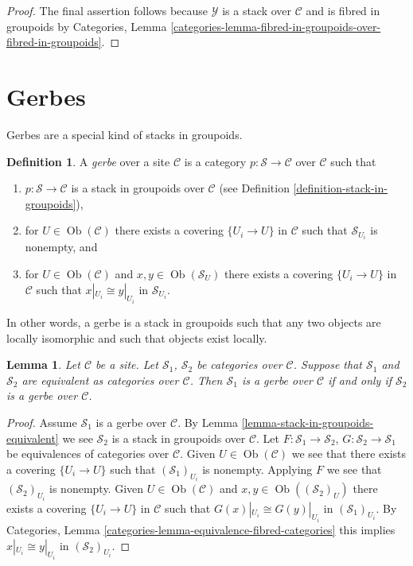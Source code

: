 \documentclass{stacks-project}
\theoremstyle{plain}
\newtheorem{lemma}[subsection]{Lemma}
\theoremstyle{definition}
\newtheorem{definition}[subsection]{Definition}
\theoremstyle{remark}
\numberwithin{equation}{subsection}
\def\Ob{\mathop{\mathrm{Ob}}\nolimits}
\begin{document}
\begin{proof}
\medskip\noindent
The final assertion follows because $\mathcal{Y}$ is a stack over
$\mathcal{C}$ and is fibred in groupoids by
Categories, Lemma
\ref{categories-lemma-fibred-in-groupoids-over-fibred-in-groupoids}.
\end{proof}





\section{Gerbes}
\label{section-gerbes}

\noindent
Gerbes are a special kind of stacks in groupoids.

\begin{definition}
\label{definition-gerbe}
A {\it gerbe} over a site $\mathcal{C}$ is a category
$p : \mathcal{S} \to \mathcal{C}$ over $\mathcal{C}$ such that
\begin{enumerate}
\item $p : \mathcal{S} \to \mathcal{C}$ is a stack
in groupoids over $\mathcal{C}$ (see
Definition \ref{definition-stack-in-groupoids}),
\item for $U \in \Ob(\mathcal{C})$ there exists
a covering $\{U_i \to U\}$ in $\mathcal{C}$ such that
$\mathcal{S}_{U_i}$ is nonempty, and
\item for $U \in \Ob(\mathcal{C})$ and
$x, y \in \Ob(\mathcal{S}_U)$ there exists
a covering $\{U_i \to U\}$ in $\mathcal{C}$ such that
$x|_{U_i} \cong y|_{U_i}$ in $\mathcal{S}_{U_i}$.
\end{enumerate}
\end{definition}

\noindent
In other words, a gerbe is a stack in groupoids such that any two objects
are locally isomorphic and such that objects exist locally.

\begin{lemma}
\label{lemma-gerbe-equivalent}
Let $\mathcal{C}$ be a site.
Let $\mathcal{S}_1$, $\mathcal{S}_2$ be categories over $\mathcal{C}$.
Suppose that $\mathcal{S}_1$ and $\mathcal{S}_2$ are equivalent
as categories over $\mathcal{C}$.
Then $\mathcal{S}_1$ is a gerbe over $\mathcal{C}$ if and only if
$\mathcal{S}_2$ is a gerbe over $\mathcal{C}$.
\end{lemma}

\begin{proof}
Assume $\mathcal{S}_1$ is a gerbe over $\mathcal{C}$. By
Lemma \ref{lemma-stack-in-groupoids-equivalent}
we see $\mathcal{S}_2$ is a stack in groupoids over $\mathcal{C}$.
Let $F : \mathcal{S}_1 \to \mathcal{S}_2$,
$G : \mathcal{S}_2 \to \mathcal{S}_1$ be equivalences of categories over
$\mathcal{C}$. Given $U \in \Ob(\mathcal{C})$ we see that there exists
a covering $\{U_i \to U\}$ such that $(\mathcal{S}_1)_{U_i}$ is
nonempty. Applying $F$ we see that $(\mathcal{S}_2)_{U_i}$ is nonempty.
Given $U \in \Ob(\mathcal{C})$ and
$x, y \in \Ob((\mathcal{S}_2)_U)$ there exists
a covering $\{U_i \to U\}$ in $\mathcal{C}$ such that
$G(x)|_{U_i} \cong G(y)|_{U_i}$ in $(\mathcal{S}_1)_{U_i}$. By
Categories, Lemma \ref{categories-lemma-equivalence-fibred-categories}
this implies $x|_{U_i} \cong y|_{U_i}$ in $(\mathcal{S}_2)_{U_i}$.
\end{proof}
\end{document}
